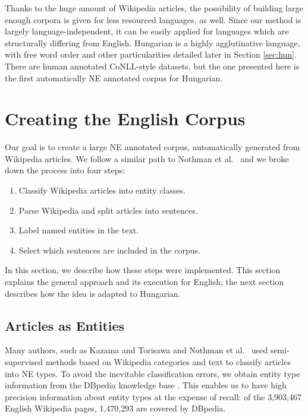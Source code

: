 \documentclass[11pt]{article}
\begin{document}
Thanks to the huge amount of Wikipedia articles, the possibility of building large enough 
corpora is given for less resourced languages, as well. Since our method is largely language-independent, it can be easily applied for languages which are structurally differing from English. Hungarian is a highly agglutinative language, with free word order and other particularities detailed later in Section \ref{sec:hun}. There are human annotated CoNLL-style datasets, but the one presented here is the first automatically NE annotated corpus for Hungarian.

\section{Creating the English Corpus} 
\label{sec:create}

Our goal is to create a large NE annotated corpus, automatically generated from Wikipedia articles. We follow a similar path to Nothman et al.~ and we broke down the process into four steps:

\begin{enumerate}
\item Classify Wikipedia articles into entity classes.
\item Parse Wikipedia and split articles into sentences.
\item Label named entities in the text.
\item Select which sentences are included in the corpus.
\end{enumerate}

In this section, we describe how these steps were implemented. This section explains the general approach and its execution for English; the next section describes how the idea is adapted to Hungarian.


\subsection{Articles as Entities}
\label{dbpedia}

Many authors, such as Kazama and Torisawa  and Nothman et al.~ used semi-supervised methods based on Wikipedia categories and text to classify articles into NE types. To avoid the inevitable classification errors, we obtain entity type information from the DBpedia knowledge base \cite{Bizer:09}. This enables us to have high precision information about entity types at the expense of recall: of the 3,903,467 English Wikipedia pages, 1,470,293 are covered by DBpedia.
\end{document}
